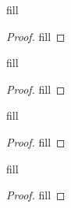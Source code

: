 \begin{exercise}{86}
fill
\end{exercise}
\begin{proof}
fill
\end{proof} 

\begin{exercise}{87}
fill
\end{exercise}
\begin{proof}
fill
\end{proof} 

\begin{exercise}{88}
fill
\end{exercise}
\begin{proof}
fill
\end{proof} 

\begin{exercise}{89}
fill
\end{exercise}
\begin{proof}
fill
\end{proof} 
